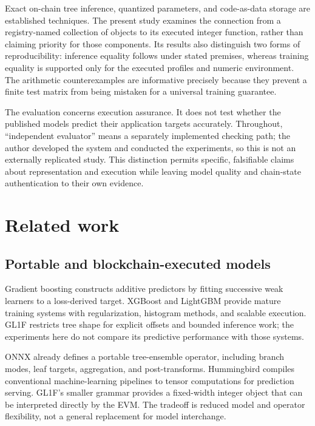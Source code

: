 \documentclass{ledger}
\begin{document}
Exact on-chain tree inference, quantized parameters, and code-as-data storage
are established techniques.\cite{alhaidari2025onchain,sequence_sstore2}
The present study examines the connection from a registry-named collection of
objects to its executed integer function, rather than claiming priority for
those components. Its results also distinguish two forms of reproducibility:
inference equality follows under stated premises, whereas training equality
is supported only for the executed profiles and numeric environment. The
arithmetic counterexamples are informative precisely because they prevent a
finite test matrix from being mistaken for a universal training guarantee.

The evaluation concerns execution assurance. It does not test whether the
published models predict their application targets accurately. Throughout,
``independent evaluator'' means a separately implemented checking path;
the author developed the system and conducted the experiments, so this is not
an externally replicated study. This distinction permits specific, falsifiable
claims about representation and execution while leaving model quality and
chain-state authentication to their own evidence.

\section{Related work}
\label{sec:related}

\subsection{Portable and blockchain-executed models}

Gradient boosting constructs additive predictors by fitting successive weak
learners to a loss-derived target.\cite{friedman2001} XGBoost and LightGBM
provide mature training systems with regularization, histogram methods, and
scalable execution.\cite{chen2016xgboost,ke2017lightgbm} GL1F restricts tree
shape for explicit offsets and bounded inference work; the experiments here
do not compare its predictive performance with those systems.

ONNX already defines a portable tree-ensemble operator, including branch
modes, leaf targets, aggregation, and post-transforms.\cite{onnx_treeensemble}
Hummingbird compiles conventional machine-learning pipelines to tensor
computations for prediction serving.\cite{nakandala2020hummingbird} GL1F's
smaller grammar provides a fixed-width integer object that can be interpreted
directly by the EVM. The tradeoff is reduced model and operator flexibility,
not a general replacement for model interchange.
\end{document}
